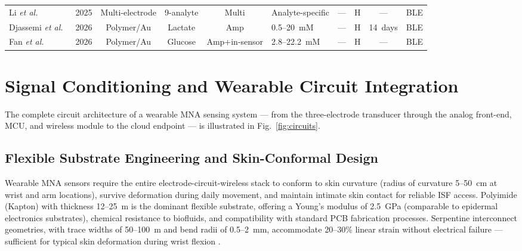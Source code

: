 \documentclass[review,1p]{elsarticle}
\begin{document}
\begin{table}[htbp]
{\begin{tabular}{p{3.0cm}ccccp{2.2cm}p{1.6cm}ccc}
Li \textit{et al.}~\cite{Li2025Innovation}                & 2025 & Multi-electrode     & 9-analyte           & Multi      & Analyte-specific              & ---                             & H & ---      & BLE \\
Djassemi \textit{et al.}~\cite{Djassemi2026ACSsens}       & 2026 & Polymer/Au          & Lactate             & Amp        & 0.5--20~mM                    & ---                             & H & 14~days  & BLE \\
Fan \textit{et al.}~\cite{Fan2026EdgeAI}                  & 2026 & Polymer/Au          & Glucose             & Amp+in-sensor & 2.8--22.2~mM               & ---                             & H & ---      & BLE \\
\bottomrule
\end{tabular}%
}
\end{table}


\section{Signal Conditioning and Wearable Circuit Integration}
\label{sec:circuits}

The complete circuit architecture of a wearable MNA sensing system — from the three-electrode transducer through the analog front-end, MCU, and wireless module to the cloud endpoint — is illustrated in Fig.~\ref{fig:circuits}.

\subsection{Flexible Substrate Engineering and Skin-Conformal Design}
\label{subsec:flex_substrate}

Wearable MNA sensors require the entire electrode-circuit-wireless stack to conform to skin curvature (radius of curvature 5--50~cm at wrist and arm locations), survive deformation during daily movement, and maintain intimate skin contact for reliable ISF access. Polyimide (Kapton) with thickness 12--25~\textmu{}m is the dominant flexible substrate, offering a Young's modulus of 2.5~GPa (comparable to epidermal electronics substrates), chemical resistance to biofluids, and compatibility with standard PCB fabrication processes. Serpentine interconnect geometries, with trace widths of 50--100~\textmu{}m and bend radii of 0.5--2~mm, accommodate 20--30\% linear strain without electrical failure — sufficient for typical skin deformation during wrist flexion \cite{Son2022Stretchable}.
\end{document}
